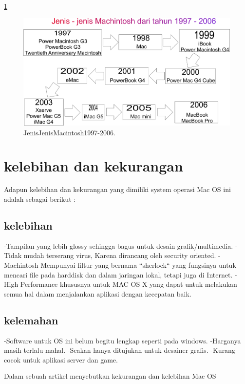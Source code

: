 	\ref{Gambar2}
	\begin{figure}[ht]
	\centerline{\includegraphics[width=1\textwidth]{figures/Gambar2.JPG}}
	\caption{JenisJenisMacintosh1997-2006.}
	\label{Gambar2}
	\end{figure}

\section{kelebihan dan kekurangan}
Adapun kelebihan dan kekurangan yang dimiliki system operasi Mac OS ini adalah sebagai berikut :

	\subsection{kelebihan}
	-Tampilan yang lebih glossy sehingga bagus untuk desain grafik/multimedia. 
	-Tidak mudah terserang virus, Karena dirancang oleh security oriented. 
	-Machintosh Mempunyai filtur yang bernama “sherlock“ yang fungsinya untuk mencari file pada harddisk dan dalam jaringan lokal, tetapi juga di Internet. 
	-High Performance khususnya untuk MAC OS X yang dapat untuk melakukan semua hal dalam menjalankan aplikasi dengan kecepatan baik. 

	\subsection{kelemahan}
	-Software untuk OS ini belum begitu lengkap seperti pada windows. 
	-Harganya masih terlalu mahal. 
	-Seakan hanya ditujukan untuk desainer grafis. 
	-Kurang cocok untuk aplikasi server dan game. 

Dalam sebuah artikel menyebutkan kekurangan dan kelebihan Mac OS
\cite{linuxwindows}

